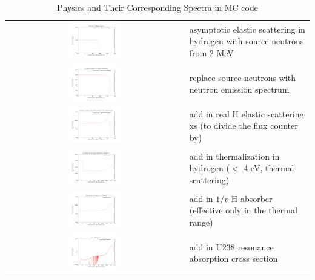 \documentclass{school-22.211-notes}
\begin{document}
\begin{table}
  \centering
  \begin{tabular}[h]{cl}
    \includegraphics[width=0.3\textwidth]{images/sl-d/spec-1.uncrop.pdf} & asymptotic elastic scattering in hydrogen with source neutrons from 2 MeV \\ 
    \includegraphics[width=0.3\textwidth]{images/sl-d/spec-2.uncrop.pdf} & replace source neutrons with neutron emission spectrum \\
    \includegraphics[width=0.3\textwidth]{images/sl-d/spec-3.uncrop.pdf} & add in real H elastic scattering xs (to divide the flux counter by) \\
    \includegraphics[width=0.3\textwidth]{images/sl-d/spec-4.uncrop.pdf} & add in thermalization in hydrogen ($<$ 4 eV, thermal scattering) \\
    \includegraphics[width=0.3\textwidth]{images/sl-d/spec-5.uncrop.pdf} & add in $1/v$ H absorber (effective only in the thermal range) \\
    \includegraphics[width=0.3\textwidth]{images/sl-d/spec-7.uncrop.pdf} & add in U238 resonance absorption cross section \\
  \end{tabular}
  \caption{Physics and Their Corresponding Spectra in MC code} \label{plot-MC}
\end{table}
\end{document}
